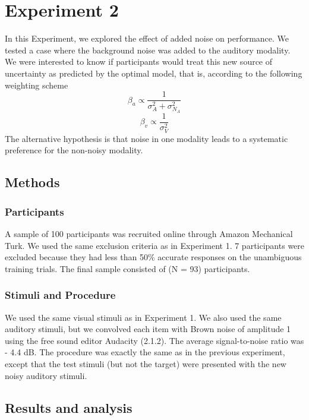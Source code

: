 \documentclass[english,man]{apa6}
\theoremstyle{definition}
\theoremstyle{definition}
\theoremstyle{definition}
\theoremstyle{remark}
\begin{document}
\section{Experiment 2}\label{experiment-2}

In this Experiment, we explored the effect of added noise on
performance. We tested a case where the background noise was added to
the auditory modality. We were interested to know if participants would
treat this new source of uncertainty as predicted by the optimal model,
that is, according to the following weighting scheme
\[\beta_a \propto \frac{1}{\sigma^2_{A}+\sigma^2_{N_A}}\]
\[\beta_v \propto \frac{1}{\sigma^2_{V}}\] The alternative hypothesis is
that noise in one modality leads to a systematic preference for the
non-noisy modality.

\subsection{Methods}\label{methods-1}

\subsubsection{Participants}\label{participants-1}

A sample of 100 participants was recruited online through Amazon
Mechanical Turk. We used the same exclusion criteria as in Experiment 1.
7 participants were excluded because they had less than 50\% accurate
responses on the unambiguous training trials. The final sample consisted
of (N = 93) participants.

\subsubsection{Stimuli and Procedure}\label{stimuli-and-procedure}

We used the same visual stimuli as in Experiment 1. We also used the
same auditory stimuli, but we convolved each item with Brown noise of
amplitude 1 using the free sound editor Audacity (2.1.2). The average
signal-to-noise ratio was - 4.4 dB. The procedure was exactly the same
as in the previous experiment, except that the test stimuli (but not the
target) were presented with the new noisy auditory stimuli.

\subsection{Results and analysis}\label{results-and-analysis-1}
\end{document}
